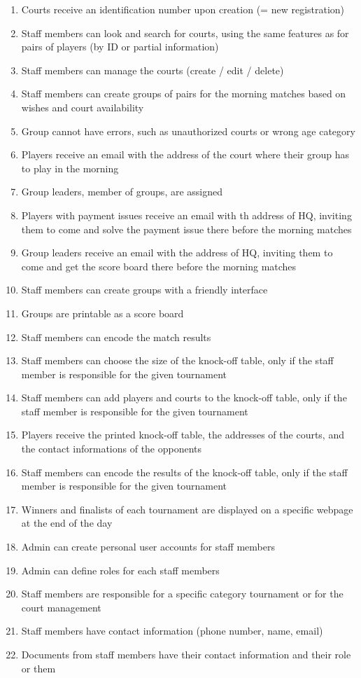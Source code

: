 \begin{enumerate}
    \item Courts receive an identification number upon creation (= new
        registration)
    \item Staff members can look and search for courts, using the same
        features as for pairs of players (by ID or partial information)
    \item Staff members can manage the courts (create / edit / delete)
    \item Staff members can create groups of pairs for the morning
        matches based on wishes and court availability
    \item Group cannot have errors, such as unauthorized courts or wrong
        age category
    \item Players receive an email with the address of the court where
        their group has to play in the morning
    \item Group leaders, member of groups, are assigned
    \item Players with payment issues receive an email with th address
        of HQ, inviting them to come and solve the payment issue there
        before the morning matches
    \item Group leaders receive an email with the address of HQ,
        inviting them to come and get the score board there before the
        morning matches
    \item Staff members can create groups with a friendly interface
    \item Groups are printable as a score board
    \item Staff members can encode the match results
    \item Staff members can choose the size of the knock-off table, only
        if the staff member is responsible for the given tournament
    \item Staff members can add players and courts to the knock-off
        table, only if the staff member is responsible for the given
        tournament
    \item Players receive the printed knock-off table, the addresses of
        the courts, and the contact informations of the opponents
    \item Staff members can encode the results of the knock-off table,
        only if the staff member is responsible for the given tournament
    \item Winners and finalists of each tournament are displayed on a
        specific webpage at the end of the day
    \item Admin can create personal user accounts for staff members
    \item Admin can define roles for each staff members
    \item Staff members are responsible for a specific category
        tournament or for the court management 
    \item Staff members have contact information (phone number, name,
        email)
    \item Documents from staff members have their contact information
        and their role or them
\end{enumerate}

